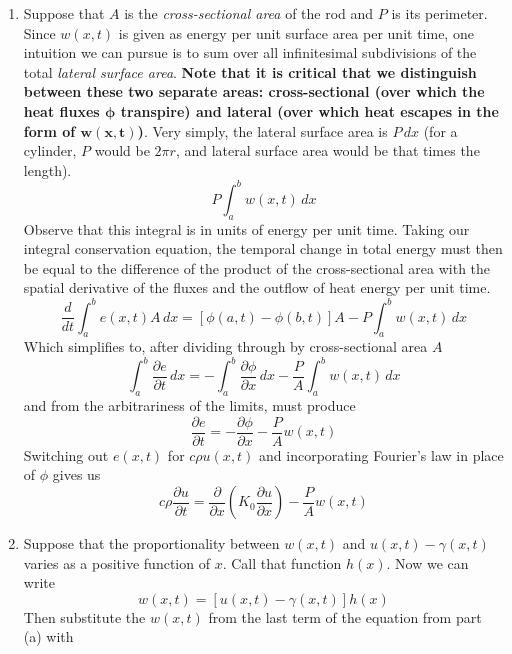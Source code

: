 \documentclass[a4paper]{article}
\begin{document}
\begin{enumerate}[label=(\alph*)]
	\item Suppose that \( A \) is the \textit{cross-sectional area} of the rod and \( P \) is its perimeter. Since \( w \!\left( x,t \right) \) is given as energy per unit surface area per unit time, one intuition we can pursue is to sum over all infinitesimal subdivisions of the total \textit{lateral surface area}. \textbf{Note that it is critical that we distinguish between these two separate areas: cross-sectional (over which the heat fluxes \( \pmb{\phi} \) transpire) and lateral (over which heat escapes in the form of \( \pmb{w \!\left( x,t \right)} \))}. Very simply, the lateral surface area is \( P \, dx \) (for a cylinder, \( P \) would be \( 2 \pi r \), and lateral surface area would be that times the length).
	\[
		P \int^{b}_{a} w \!\left( x,t \right) \, dx
	\]
	Observe that this integral is in units of energy per unit time. Taking our integral conservation equation, the temporal change in total energy must then be equal to the difference of the product of the cross-sectional area with the spatial derivative of the fluxes and the outflow of heat energy per unit time.
	\[
		 \frac{d }{d t}\int^{b}_{a} e \!\left( x,t \right)A \, dx = \!\left[ \phi \!\left( a,t \right) - \phi \!\left( b,t \right) \right]A - P \int^{b}_{a} w \!\left( x,t \right) \, dx 
	\]
	Which simplifies to, after dividing through by cross-sectional area \( A \)
	\[
		\int^{b}_{a} \frac{\partial e}{\partial t} \, dx = -\int^{b}_{a} \frac{\partial \phi}{\partial x} \, dx - \frac{P}{A}\int^{b}_{a} w \!\left( x,t \right) \, dx    
	\]
	and from the arbitrariness of the limits, must produce
	\[
		\frac{\partial e}{\partial t} = -\frac{\partial \phi}{\partial x} - \frac{P}{A}w \!\left( x,t \right) 
	\]
	Switching out \( e \!\left( x,t \right) \) for \( c \rho u \!\left( x,t \right) \) and incorporating Fourier's law in place of \( \phi \) gives us
	\[
		c \rho \frac{\partial u}{\partial t} = \frac{\partial }{\partial x}\!\left( K_{0}\frac{\partial u}{\partial x} \right) - \frac{P}{A}w \!\left( x,t \right) 
	\]
	\item Suppose that the proportionality between \( w \!\left( x,t \right) \) and \( u \!\left( x,t \right) - \gamma \!\left( x,t \right) \) varies as a positive function of \( x \). Call that function \( h \!\left( x \right) \). Now we can write
	\[
		 w \!\left( x,t \right) = \!\left[ u \!\left( x,t \right) - \gamma \!\left( x,t \right) \right]h \!\left( x \right)
	\]
	Then substitute the \( w \!\left( x,t \right) \) from the last term of the equation from part (a) with

\end{enumerate}
\end{document}
